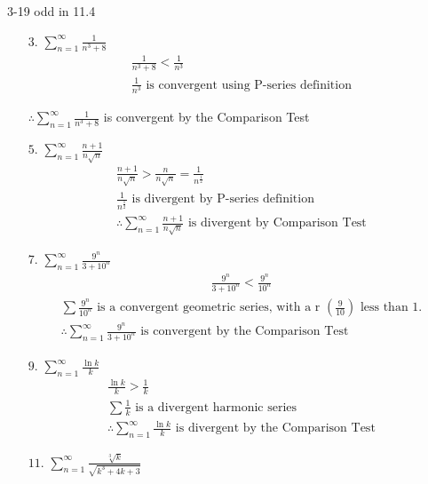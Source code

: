 \documentclass[12pt]{article}
\begin{document}
\begin{enumerate}
    3-19 odd in 11.4
    \begin{enumerate}
        \item[$3.$]$\sum^\infty_{n=1}\frac{1}{n^3+8}$
        \begin{gather*}
            \frac{1}{n^3+8} < \frac{1}{n^3}\\
            \text{$\frac{1}{n^3}$ is convergent using P-series definition}
        \end{gather*}
        \begin{center}
            $\therefore\sum^\infty_{n=1}\frac{1}{n^3+8}$ is convergent by the Comparison Test
        \end{center}
        \item[$5.$]$\sum^\infty_{n=1}\frac{n+1}{n\sqrt{n}}$
        \begin{gather*}
           \frac{n+1}{n\sqrt{n}}>\frac{n}{n\sqrt{n}}=\frac{1}{n^\frac{1}{2}}\\
           \text{$\frac{1}{n^\frac{1}{2}}$ is divergent by P-series definition}\\
           \text{$\therefore\sum^\infty_{n=1}\frac{n+1}{n\sqrt{n}}$ is divergent by Comparison Test}
        \end{gather*}
        \item[$7.$]$\sum^\infty_{n=1}\frac{9^n}{3+10^n}$
        \begin{gather*}
            \frac{9^n}{3+10^n} < \frac{9^n}{10^n}
        \end{gather*}
        \begin{gather*}
            \text{$\sum\frac{9^n}{10^n}$ is a convergent geometric series, with a r $\left(\frac{9}{10}\right)$ less than 1.}\\
            \text{$\therefore \sum^\infty_{n=1}\frac{9^n}{3+10^n}$ is convergent by the Comparison Test } 
        \end{gather*}
        \item[$9.$]$\sum^\infty_{n=1}\frac{\ln k}{k}$
        \begin{gather*}
            \frac{\ln k}{k} > \frac{1}{k}\\
            \text{$\sum\frac{1}{k}$ is a divergent harmonic series  }
            \\\text{$\therefore\sum^\infty_{n=1}\frac{\ln k}{k}$ is divergent by the Comparison Test}
        \end{gather*}
        \item[$11.$]$\sum^\infty_{n=1}\frac{\sqrt[3]{k}}{\sqrt{k^3+4k+3}}$
        \begin{gather*}

\end{gather*}
\end{enumerate}
\end{enumerate}
\end{document}
